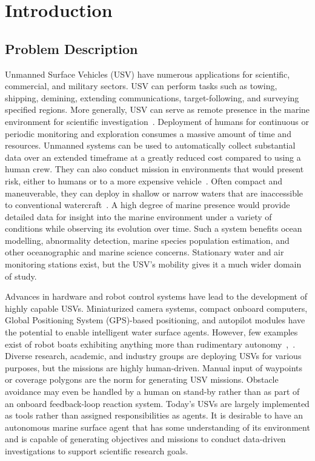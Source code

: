 \documentclass{tamuccthesis}
\begin{document}
\chapter{Introduction}

\section{Problem Description}

Unmanned Surface Vehicles (USV) have numerous applications for scientific, commercial, and military sectors. USV can perform tasks such as towing, shipping, demining, extending communications, target-following, and surveying specified regions. More generally, USV can serve as remote presence in the marine environment for scientific investigation~\cite{manley2008unmanned}. Deployment of humans for continuous or periodic monitoring and exploration consumes a massive amount of time and resources. Unmanned systems can be used to automatically collect substantial data over an extended timeframe at a greatly reduced cost compared to using a human crew. They can also conduct mission in environments that would present risk, either to humans or to a more expensive vehicle~\cite{liu:2016}. Often compact and maneuverable, they can deploy in shallow or narrow waters that are inaccessible to conventional watercraft~\cite{liu:2016}. A high degree of marine presence would provide detailed data for insight into the marine environment under a variety of conditions while observing its evolution over time. Such a system benefits ocean modelling, abnormality detection, marine species population estimation, and other oceanographic and marine science concerns. Stationary water and air monitoring stations exist, but the USV's mobility gives it a much wider domain of study. 

Advances in hardware and robot control systems have lead to the development of highly capable USVs. Miniaturized camera systems, compact onboard computers,  Global Positioning System (GPS)-based positioning, and autopilot modules have the potential to enable intelligent water surface agents. However, few examples exist of robot boats exhibiting anything more than rudimentary autonomy~\cite{bertram2008unmanned},~\cite{liu:2016}. Diverse research, academic, and industry groups are deploying USVs for various purposes, but the missions are highly human-driven. Manual input of waypoints or coverage polygons are the norm for generating USV missions. Obstacle avoidance may even be handled by a human on stand-by rather than as part of an onboard feedback-loop reaction system. Today's USVs are largely implemented as tools rather than assigned responsibilities as agents. It is desirable to have an autonomous marine surface agent that has some understanding of its environment and is capable of generating objectives and missions to conduct data-driven investigations to support scientific research goals.
\end{document}
